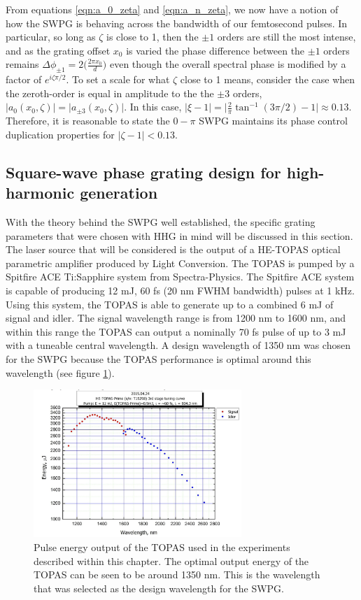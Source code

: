 From equations \ref{eqn:a_0_zeta} and \ref{eqn:a_n_zeta}, we now have a notion of how the SWPG is behaving across the bandwidth of our femtosecond pulses.  In particular, so long as $\zeta$ is close to 1, then the $\pm1$ orders are still the most intense, and as the grating offset $x_0$ is varied the phase difference between the $\pm1$ orders remains $\Delta\phi_{\pm1}=2\bigg(\frac{2\pi x_0}{d}\bigg)$ even though the overall spectral phase is modified by a factor of $e^{i\zeta\pi/2}$.  To set a scale for what $\zeta$ close to 1 means, consider the case when the zeroth-order is equal in amplitude to the the $\pm3$ orders, $\rvert a_0(x_0,\zeta)\rvert = \rvert a_{\pm3}(x_0,\zeta)\rvert$.  In this case, $\rvert \xi - 1\rvert=\rvert\frac{2}{\pi}\tan^{-1}(3\pi/2)-1\rvert\approx0.13$.  Therefore, it is reasonable to state the $0-\pi$ SWPG maintains its phase control duplication properties for $\rvert\zeta - 1\rvert<0.13$.

\subsection{Square-wave phase grating design for high-harmonic generation}
With the theory behind the SWPG well established, the specific grating parameters that were chosen with HHG in mind will be discussed in this section.  The laser source that will be considered is the output of a HE-TOPAS optical parametric amplifier produced by Light Conversion.  The TOPAS is pumped by a Spitfire ACE Ti:Sapphire system from Spectra-Physics.  The Spitfire ACE system is capable of producing  12 mJ, 60 fs (20 nm FWHM bandwidth) pulses at 1 kHz.  Using this system, the TOPAS is able to generate up to a combined 6 mJ of signal and idler. The signal wavelength range is from 1200 nm to 1600 nm, and within this range the TOPAS can output a nominally 70 fs pulse of up to 3 mJ with a tuneable central wavelength.  A design wavelength of 1350 nm was chosen for the SWPG because the TOPAS performance is optimal around this wavelength (see figure \ref{fig:TOPAS_output}).
\begin{figure}
	\centering
	\includegraphics[width=0.7\textwidth]{figures/TOPAS/Topas_output.png}
	\caption{Pulse energy output of the TOPAS used in the experiments described within this chapter.  The optimal output energy of the TOPAS can be seen to be around 1350 nm.  This is the wavelength that was selected as the design wavelength for the SWPG.}
	\label{fig:TOPAS_output}
\end{figure}


